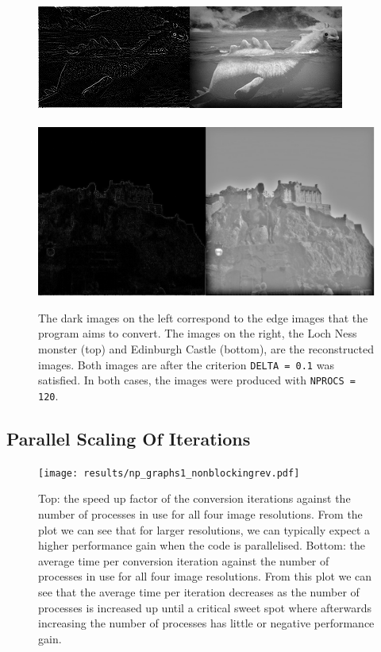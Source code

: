 \documentclass[11pt, a4paper]{article}
\begin{document}
					
			\begin{figure}
				\centering
				\includegraphics[scale=0.805]{image1.png}
				~\\~\\
				\includegraphics[scale=0.20]{image4.png}
				\caption{The dark images on the left correspond to the edge images that the program aims to convert. The images on the right, the Loch Ness monster (top) and Edinburgh Castle (bottom), are the reconstructed images. Both images are after the criterion \texttt{DELTA = 0.1} was satisfied. In both cases, the images were produced with \texttt{NPROCS = 120}.}
				\label{fig:before_after_images}
			\end{figure}

		\subsection{Parallel Scaling Of Iterations}	
			\begin{figure}
				\centering
				\texttt{[image: results/np\_graphs1\_nonblockingrev.pdf]}
				\caption{Top: the speed up factor of the conversion iterations against the number of processes in use for all four image resolutions. From the plot we can see that for larger resolutions, we can typically expect a higher performance gain when the code is parallelised. Bottom: the average time per conversion iteration against the number of processes in use for all four image resolutions. From this plot we can see that the average time per iteration decreases as the number of processes is increased up until a critical sweet spot where afterwards increasing the number of processes has little or negative performance gain.}
				\label{fig:np_runtime1}
			\end{figure}
\end{document}
